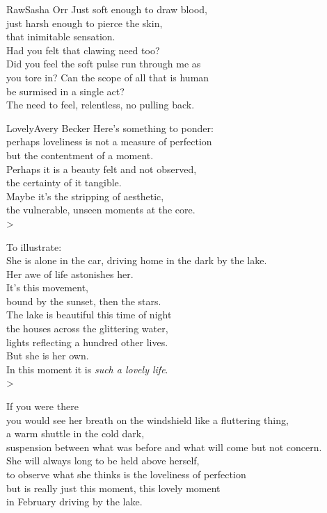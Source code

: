 
\begin{poetry}{Raw}{Sasha Orr}
Just soft enough to draw blood,\\
just harsh enough to pierce the skin,\\
that inimitable sensation.\\
Had you felt that clawing need too?\\
Did you feel the soft pulse run through me as\\
you tore in? Can the scope of all that is human\\
be surmised in a single act?\\
The need to feel, relentless, no pulling back.
\end{poetry}

\begin{poetry}{Lovely}{Avery Becker}
Here's something to ponder:\\
perhaps loveliness is not a measure of perfection\\
but the contentment of a moment.\\
Perhaps it is a beauty felt and not observed,\\
the certainty of it tangible.\\
Maybe it's the stripping of aesthetic,\\
the vulnerable, unseen moments at the core.\\>

To illustrate:\\
She is alone in the car, driving home in the dark by the lake.\\
Her awe of life astonishes her.\\
It's this movement,\\
bound by the sunset, then the stars.\\
The lake is beautiful this time of night\\
the houses across the glittering water,\\
lights reflecting a hundred other lives.\\
But she is her own.\\
In this moment it is \textit{such a lovely life}.\\>

If you were there\\
you would see her breath on the windshield like a fluttering thing,\\
a warm shuttle in the cold dark,\\
suspension between what was before and what will come but not concern.\\
She will always long to be held above herself,\\
to observe what she thinks is the loveliness of perfection\\
but is really just this moment, this lovely moment\\
in February driving by the lake.
\end{poetry}


